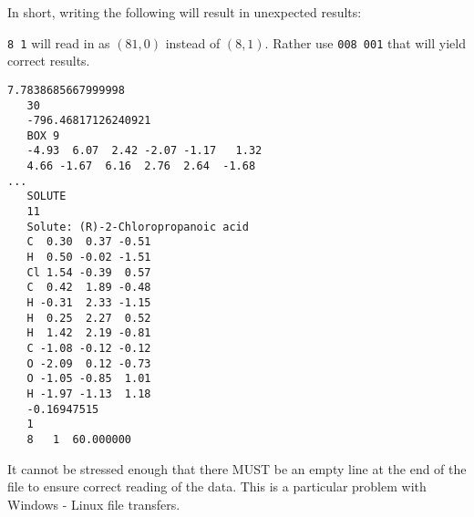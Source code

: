 In short, writing the following will result in unexpected results:

\verb|8 1| will read in as $(81, 0)$ instead of $(8, 1)$. Rather use 
\verb|008 001| that will yield correct results.

\begin{lstlisting}[caption=Example of a correct box-file]
   7.7838685667999998     
   30
   -796.46817126240921     
   BOX 9
   -4.93  6.07  2.42 -2.07 -1.17   1.32     
   4.66 -1.67  6.16  2.76  2.64  -1.68     
...     
   SOLUTE
   11
   Solute: (R)-2-Chloropropanoic acid
   C  0.30  0.37 -0.51
   H  0.50 -0.02 -1.51
   Cl 1.54 -0.39  0.57
   C  0.42  1.89 -0.48
   H -0.31  2.33 -1.15
   H  0.25  2.27  0.52
   H  1.42  2.19 -0.81
   C -1.08 -0.12 -0.12
   O -2.09  0.12 -0.73
   O -1.05 -0.85  1.01
   H -1.97 -1.13  1.18
   -0.16947515     
   1
   8   1  60.000000

\end{lstlisting}

It cannot be stressed enough that there MUST be an empty line at the end of the 
file to ensure correct reading of the data. This is a particular problem with 
Windows - Linux file transfers.